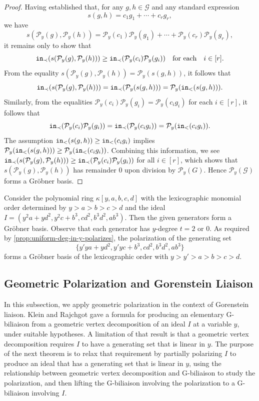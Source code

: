 \documentclass[12pt, reqno]{amsart}
\numberwithin{equation}{section}
\newtheorem{Main Conjecture}[theorem]{Main Conjecture}
\theoremstyle{definition}
\newenvironment{example}
  {\pushQED{\qed}\renewcommand{\qedsymbol}{$\diamondsuit$}\examplex}
  {\popQED\endexamplex}
\theoremstyle{plain}
\newcommand{\init}{{\tt in}}
\newcommand{\G}{\mathcal{G}}
\renewcommand{\P}{\mathcal{P}}
\newcommand{\qforeach}{\quad \mbox{for each} \quad}
\begin{document}
\begin{proof}
Having established that, for any $g, h \in \G$ and any standard expression \[
s(g,h) = c_1g_1+\cdots+c_rg_r,
\] we have \[
 s(\P_y(g),\P_y(h)) = \P_y(c_1)\P_y(g_1)+\cdots+\P_y(c_r)\P_y(g_r),
\] it remains only to show that \[
\init_\prec(s(\P_y(g),\P_y(h))) \geq \init_\prec(\P_y(c_i)\P_y(g_i)) \qforeach  i \in [r].
\] From the equality $s(\P_y(g),\P_y(h)) = \P_y(s(g, h))$, it follows that \[
\init_\prec(s(\P_y(g),\P_y(h))) = \init_\prec(\P_y(s(g, h))) = \P_y(\init_<(s(g,h))).
\] Similarly, from the equalities $\P_y(c_i)\P_y(g_i) = \P_y(c_ig_i)$ for each $i \in [r]$, it follows that \[
\init_\prec(\P_y(c_i)\P_y(g_i)) = \init_\prec(\P_y(c_ig_i)) = \P_y(\init_<(c_ig_i)).
\]
The assumption $\init_<(s(g,h)) \geq \init_<(c_ig_i)$ implies $\P_y(\init_<(s(g,h))) \geq \P_y(\init_<(c_ig_i))$.  Combining this information, we see $\init_\prec(s(\P_y(g),\P_y(h))) \geq \init_\prec(\P_y(c_i)\P_y(g_i))$ for all $i \in [r]$, which shows that $s(\P_y(g),\P_y(h))$ has remainder $0$ upon division by $\P_y(G)$.  Hence $\P_y(\G)$ forms a Gr\"obner basis.
\end{proof}

\begin{example}\label{ex:uniform-y-degree-polarizes}
    Consider the polynomial ring $\kappa[y,a,b,c,d]$ with the lexicographic monomial order determined by $y>a>b>c>d$ and the ideal $I = (y^2a+yd^2, y^2c+b^3, cd^2,b^3d^2,ab^3)$. Then the given generators form a Gr\"obner basis. Observe that each generator has $y$-degree $t=2$ or $0$. As required by \cref{prop:uniform-deg-in-y-polarizes}, the polarization of the generating set 
    \[
    \{y'ya+yd^2, y'yc+b^3, cd^2, b^3d^2, ab^3 \}
    \]
    forms a Gr\"obner basis of the lexicographic order with $y>y'>a>b>c>d$. 
\end{example}

\subsection{Geometric Polarization and Gorenstein Liaison }

In this subsection, we apply geometric polarization in the context of Gorenstein liaison.  Klein and Rajchgot \cite{KR21} gave a formula for producing an elementary G-biliaison from a geometric vertex decomposition of an ideal $I$ at a variable $y$, under suitable hypotheses.  A limitation of that result is that a geometric vertex decomposition requires $I$ to have a generating set that is linear in $y$.  The purpose of the next theorem is to relax that requirement by partially polarizing $I$ to produce an ideal that has a generating set that is linear in $y$, using the relationship between geometric vertex decomposition and G-biliaison to study the polarization, and then lifting the G-biliaison involving the polarization to a G-biliaison involving $I$.
\end{document}
